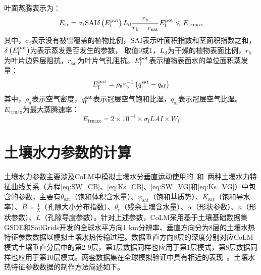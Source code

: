 叶面蒸腾表示为：
\begin{equation}
  {E}_{\mathrm{{tr}}}=\sigma_{\mathrm{{f}}} {\rm SAI} \delta\left({E}_{\mathrm{{f}}}^{{\rm pot}}\right) {L}_{\mathrm{{d}}} \frac{{r}_{\mathrm{{b}}}}{{r}_{\mathrm{{b}}}-{r}_{\mathrm{{sat}}}} {E}_{\mathrm{{f}}}^{{\rm pot}} \leqslant {E}_{\mathrm{{trmax}}}
\end{equation}
其中，$\sigma_{\mathrm {f}} $表示没有被雪覆盖的植物比例，${\rm SAI}$表示叶面积指数和茎面积指数之和，$\delta\left(E_{\mathrm {f}} ^{\rm pot}\right)$为表示蒸发是否发生的参数，
取值0或1，$L_{\mathrm {d}} $为干燥的植物表面比例，$r_{\mathrm {b}} $为叶片边界层阻抗，$r_{\mathrm {sat}} $为叶片气孔阻抗。$E_{\mathrm {f}} ^{\rm pot}$表示植物表面水的单位面积蒸发量：
\begin{equation}
  {E}_{\mathrm{{f}}}^{{\rm pot}}=\rho_{\mathrm{{a}}} {r}_{\mathrm{{b}}}^{-1}\left({q}_{\mathrm{{f}}}^{{\rm sat}}-{q}_{\mathrm{{af}}}\right)
\end{equation}
其中，$\rho_{\mathrm {a}} $表示空气密度，$q_{\mathrm {f}} ^{\rm sat}$表示冠层空气饱和比湿，$q_{\mathrm{af}}$表示冠层空气比湿。$E_{\mathrm{trmax}}$为最大蒸腾速率：
\begin{equation}
  {E}_{\mathrm{ {trmax }}}=2 \times 10^{-4} \times \sigma_{\mathrm{{f}}} L A I \times W_{\mathrm{t}}
\end{equation}

\section{土壤水力参数的计算}\label{sec_hydropar}
土壤水力参数主要涉及CoLM中模拟土壤水分垂直运动使用的~\citet{campbell1974}和~\citet{van1980closed}两种土壤水力特征曲线关系（方程\eqref{eq:SW_CB}、\eqref{eq:Ks_CB}、\eqref{eq:SW_VG}和\eqref{eq:Ks_VG}）中包含的参数，主要有$\theta_{\mathrm {sat}} $（饱和体积含水量）、$\psi_{\mathrm {sat}} $（饱和基质势）、$K_{\mathrm {sat}} $（饱和导水率）、$B=\frac{1}{\lambda}$（孔隙大小分布指数）、$\theta_{\mathrm {r}} $（残余土壤含水量）、$\alpha$（形状参数）、$n$（形状参数）、$L$（孔隙导度参数）。针对上述参数，CoLM采用基于土壤基础数据集GSDE和SoilGrids开发的全球水平方向1 km分辨率、垂直方向分为8层的土壤水热特征参数数据以模拟土壤水热传输过程。数据垂直方向8层的深度分别对应CoLM模式土壤垂直分层中的第2-9层，第1层数据同样也应用于第1层模式，第8层数据同样也应用于第10层模式。两套数据集在全球模拟验证中具有相近的表现~\citep{李文耀2020土壤}。土壤水热特征参数数据的制作方法简述如下。

